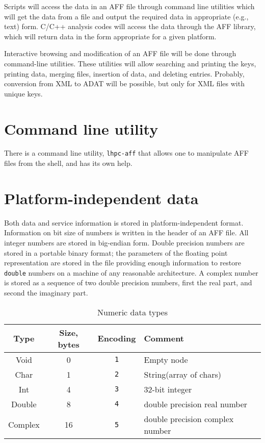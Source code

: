 \documentclass[10pt,letterpaper]{article}
\newcommand{\bc}{\begin{center}}
\newcommand{\ec}{\end{center}}
\newcommand{\ctext}[1]{\texttt{#1}}         %
\newcommand{\libname}[1]{\ctext{#1}\index{\ctext{#1}}} %
\newcommand{\ctype}[1]{\ctext{#1}}          %
\begin{document}
Scripts will access the data in an AFF file through command line utilities which will get the
data from a file and output the required data in appropriate (e.g., text) form. C/C++ analysis
codes will access the data through the AFF library, which will return data in the form
appropriate for a given platform.

Interactive browsing and modification of an AFF file will be done through command-line utilities. 
These utilities will allow searching and printing the keys, printing data, merging files,
insertion of data, and deleting entries. Probably, conversion from XML to ADAT will be possible,
but only for XML files with unique keys.

\section{Command line utility}
There is a command line utility, \libname{lhpc-aff} that allows one to manipulate AFF files from the shell, and has its own help.

\section{Platform-independent data}
Both data and service information is stored in platform-independent format. 
Information on bit size of numbers is written in the header of an AFF file.
All integer numbers are stored in big-endian form. 
Double precision numbers are stored in a portable binary format; the parameters of the floating
point representation are stored in the file providing enough information to restore \ctype{double}
numbers on a machine of any reasonable architecture. 
A complex number is stored as a sequence of two double precision numbers, first the real part,
and second the imaginary part.

\begin{table}[ht]
\bc
\caption{Numeric data types}\label{tab:types}
\begin{tabular}{|c|c|c|l|} \hline
Type & Size, bytes & Encoding & Comment \\ \hline
Void & 0 & \ctext{1}& Empty node \\
Char & 1 & \ctext{2}& String(array of chars) \\
Int   & 4 & \ctext{3}& 32-bit integer \\
Double & 8 & \ctext{4}& double precision real number \\
Complex & 16 & \ctext{5}& double precision complex number \\ \hline
\end{tabular}
\ec
\end{table}
\end{document}
